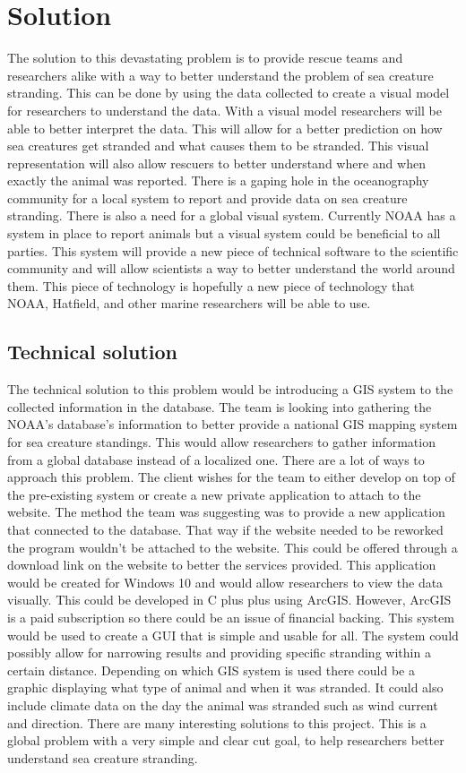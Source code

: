\documentclass[onecolumn, draftclsnofoot,10pt, compsoc]{IEEEtran}
\begin{document}
  \section{Solution}
      The solution to this devastating problem is to provide rescue teams and researchers alike with a way to better understand the problem of sea creature stranding. This can be done by using the data collected to create a visual model for researchers to understand the data. With a visual model researchers will be able to better interpret the data. This will allow for a better prediction on how sea creatures get stranded and what causes them to be stranded. This visual representation will also allow rescuers to better understand where and when exactly the animal was reported. There is a gaping hole in the oceanography community for a local system to report and provide data on sea creature stranding. There is also a need for a global visual system. Currently NOAA has a system in place to report animals but a visual system could be beneficial to all parties. This system will provide a new piece of technical software to the scientific community and will allow scientists a way to better understand the world around them. This piece of technology is hopefully a new piece of technology that NOAA, Hatfield, and other marine researchers will be able to use.
      
      \subsection{Technical solution}
      The technical solution to this problem would be introducing a GIS system to the collected information in the database. The team is looking into gathering the NOAA's database's information to better provide a national GIS mapping system for sea creature standings. This would allow researchers to gather information from a global database instead of a localized one. There are a lot of ways to approach this problem. The client wishes for the team to either develop on top of the pre-existing system or create a new private application to attach to the website. The method the team was suggesting was to provide a new application that connected to the database. That way if the website needed to be reworked the program wouldn't be attached to the website. This could be offered through a download link on the website to better the services provided. This application would be created for Windows 10 and would allow researchers to view the data visually. This could be developed in C plus plus using ArcGIS. However, ArcGIS is a paid subscription so there could be an issue of financial backing. This system would be used to create a GUI that is simple and usable for all. The system could possibly allow for narrowing results and providing specific stranding within a certain distance. Depending on which GIS system is used there could be a graphic displaying what type of animal and when it was stranded. It could also include climate data on the day the animal was stranded such as wind current and direction. There are many interesting solutions to this project. This is a global problem with a very simple and clear cut goal, to help researchers better understand sea creature stranding.
        
\end{document}
